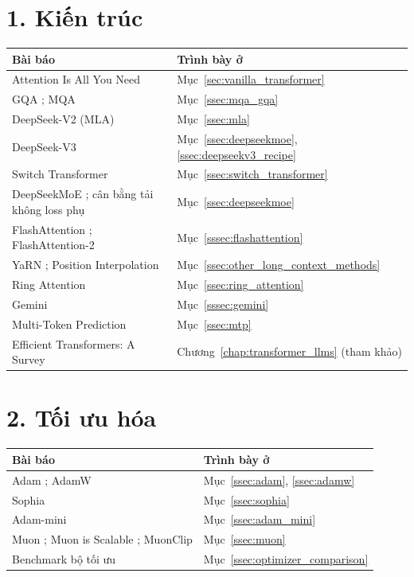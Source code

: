 \section*{1. Kiến trúc}
\begin{longtable}{@{}p{7.2cm}p{7.6cm}@{}}
\toprule
\textbf{Bài báo} & \textbf{Trình bày ở} \\
\midrule
\endhead
Attention Is All You Need \cite{vaswani2017attention} & Mục~\ref{sec:vanilla_transformer} \\
GQA \cite{ainslie2023gqa}; MQA \cite{shazeer2019fast} & Mục~\ref{ssec:mqa_gqa} \\
DeepSeek-V2 (MLA) \cite{deepseekai2024v2} & Mục~\ref{ssec:mla} \\
DeepSeek-V3 \cite{deepseekai2024v3} & Mục~\ref{ssec:deepseekmoe}, \ref{ssec:deepseekv3_recipe} \\
Switch Transformer \cite{fedus2022switch} & Mục~\ref{ssec:switch_transformer} \\
DeepSeekMoE \cite{dai2024deepseekmoe}; cân bằng tải không loss phụ \cite{wang2024auxlossfree} & Mục~\ref{ssec:deepseekmoe} \\
FlashAttention \cite{dao2022flashattention}; FlashAttention-2 \cite{dao2024flashattention2} & Mục~\ref{sssec:flashattention} \\
YaRN \cite{peng2023yarn}; Position Interpolation \cite{chen2023extending} & Mục~\ref{ssec:other_long_context_methods} \\
Ring Attention \cite{liu2023ring} & Mục~\ref{ssec:ring_attention} \\
Gemini \cite{geminiteam2023gemini} & Mục~\ref{sssec:gemini} \\
Multi-Token Prediction \cite{gloeckle2024mtp} & Mục~\ref{ssec:mtp} \\
Efficient Transformers: A Survey \cite{tay2022efficient} & Chương~\ref{chap:transformer_llms} (tham khảo) \\
\bottomrule
\end{longtable}

\section*{2. Tối ưu hóa}
\begin{longtable}{@{}p{7.2cm}p{7.6cm}@{}}
\toprule
\textbf{Bài báo} & \textbf{Trình bày ở} \\
\midrule
\endhead
Adam \cite{kingma2014adam}; AdamW \cite{loshchilov2019adamw} & Mục~\ref{ssec:adam}, \ref{ssec:adamw} \\
Sophia \cite{liu2024sophia} & Mục~\ref{ssec:sophia} \\
Adam-mini \cite{zhang2025adammini} & Mục~\ref{ssec:adam_mini} \\
Muon \cite{jordan2024muon}; Muon is Scalable \cite{liu2025muon}; MuonClip \cite{kimiteam2025k2} & Mục~\ref{ssec:muon} \\
Benchmark bộ tối ưu \cite{wen2025fantastic} & Mục~\ref{ssec:optimizer_comparison} \\
\bottomrule
\end{longtable}

